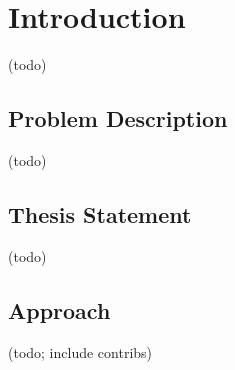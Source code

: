 \chapter{Introduction} \label{chp:introduction}

(todo)

\section{Problem Description}

(todo)

\section{Thesis Statement}

(todo)

\section{Approach}

(todo; include contribs)
